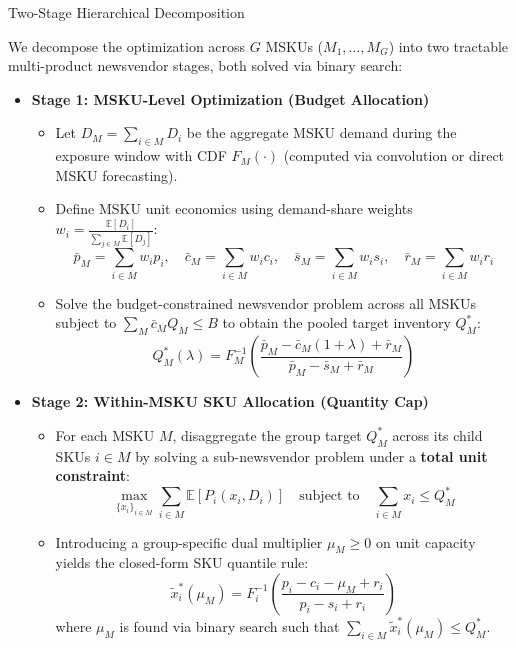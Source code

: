 \documentclass[11pt]{beamer}
\begin{document}
\begin{frame}[allowframebreaks]{Two-Stage Hierarchical Decomposition}
\begin{small}
We decompose the optimization across $G$ MSKUs ($M_1, \dots, M_G$) into two tractable multi-product newsvendor stages, both solved via binary search:

\begin{itemize}
\item \textbf{Stage 1: MSKU-Level Optimization (Budget Allocation)}
\begin{itemize}
\item Let $D_M = \sum_{i \in M} D_i$ be the aggregate MSKU demand during the exposure window with CDF $F_M(\cdot)$ (computed via convolution or direct MSKU forecasting).
\item Define MSKU unit economics using demand-share weights $w_i = \frac{\mathbb{E}[D_i]}{\sum_{j \in M} \mathbb{E}[D_j]}$:
\begin{equation*}
\bar{p}_M = \sum_{i \in M} w_i p_i, \quad \bar{c}_M = \sum_{i \in M} w_i c_i, \quad \bar{s}_M = \sum_{i \in M} w_i s_i, \quad \bar{r}_M = \sum_{i \in M} w_i r_i
\end{equation*}
\item Solve the budget-constrained newsvendor problem across all MSKUs subject to $\sum_{M} \bar{c}_M Q_M \leq B$ to obtain the pooled target inventory $Q_M^*$:
\begin{equation*}
Q_M^*(\lambda) = F_M^{-1}\left( \frac{\bar{p}_M - \bar{c}_M (1+\lambda) + \bar{r}_M}{\bar{p}_M - \bar{s}_M + \bar{r}_M} \right)
\end{equation*}
\end{itemize}
\end{itemize}
\end{small}

\framebreak
\begin{small}
\begin{itemize}
\item \textbf{Stage 2: Within-MSKU SKU Allocation (Quantity Cap)}
\begin{itemize}
\item For each MSKU $M$, disaggregate the group target $Q_M^*$ across its child SKUs $i \in M$ by solving a sub-newsvendor problem under a \textbf{total unit constraint}:
\begin{equation*}
\max_{\{x_i\}_{i \in M}} \sum_{i \in M} \mathbb{E}[P_i(x_i, D_i)] \quad \text{subject to} \quad \sum_{i \in M} x_i \leq Q_M^*
\end{equation*}
\item Introducing a group-specific dual multiplier $\mu_M \geq 0$ on unit capacity yields the closed-form SKU quantile rule:
\begin{equation*}
\tilde{x}_i^*(\mu_M) = F_i^{-1}\left( \frac{p_i - c_i - \mu_M + r_i}{p_i - s_i + r_i} \right)
\end{equation*}
where $\mu_M$ is found via binary search such that $\sum_{i \in M} \tilde{x}_i^*(\mu_M) \leq Q_M^*$.
\end{itemize}
\end{itemize}
\end{small}
\end{frame}
\end{document}
